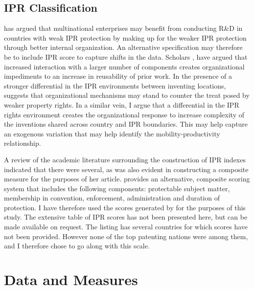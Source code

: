 \documentclass[12pt]{article}
\begin{document}
\subsection{IPR Classification}
\cite{Zhao2006} has argued  that multinational enterprises may benefit from conducting R\&D in countries with weak IPR protection by  making up for the weaker IPR protection through better internal organization. An alternative specification may therefore be to include IPR score to capture shifts in the data. Scholars \citep{Yayavaram2008, Baldwin2015}, have argued that increased interaction with a larger number of components creates organizational impediments to an increase in reusability of prior work. In the presence of a stronger differential in the IPR environments between inventing locations, \cite{Zhao2006} suggests that organizational mechanisms may stand to counter the treat posed by weaker property rights. In a similar vein, I argue that a differential in the IPR rights environment creates the organizational response to increase complexity of the inventions shared across country and IPR boundaries. This may help capture an exogenous variation that may help identify the mobility-productivity relationship.

A review of the academic literature surrounding the construction of IPR indexes indicated that there were several, as was also evident in \cite{Zhao2006} constructing a composite measure for the purposes of her article. \cite{Lesser2010} provides an alternative, composite scoring system that includes the following components: protectable subject matter, membership in convention, enforcement, administration and duration of protection. I have therefore used the scores generated by \cite{Lesser2010} for the purposes of this study. The extensive table of IPR scores has not been presented here, but can be made available on request. The listing has several countries for which scores have not been provided. However none of the top patenting nations were among them, and I therefore chose to go along with this scale.

\section{Data and Measures}
\end{document}
